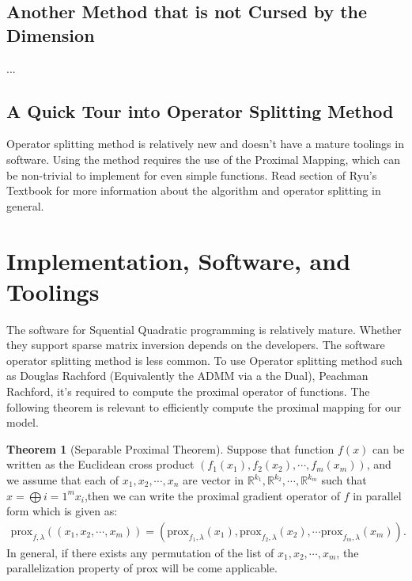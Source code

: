\documentclass[11pt]{article}
\theoremstyle{definition}
\newtheorem{theorem}{Theorem}       %
\numberwithin{equation}{subsection}
\begin{document}
    \subsection{Another Method that is not Cursed by the Dimension}
        ...
    \subsection{A Quick Tour into Operator Splitting Method}
        Operator splitting method is relatively new and doesn't have a mature toolings in software. 
        Using the method requires the use of the Proximal Mapping, which can be non-trivial to implement for even simple functions. 
        Read section \cite[section 2.7]{ryu_large-scale_2022} of Ryu's Textbook for more information about the algorithm and operator splitting in general. 
        
        
\section{Implementation, Software, and Toolings}
    The software for Squential Quadratic programming is relatively mature. 
    Whether they support sparse matrix inversion depends on the developers. 
    The software operator splitting method is less common.
    To use Operator splitting method such as Douglas Rachford (Equivalently the ADMM via a the Dual), Peachman Rachford, it's required to compute the proximal operator of functions. 
    The following theorem is relevant to efficiently compute the proximal mapping for our model. 
    \begin{theorem}[Separable Proximal Theorem]
        Suppose that function $f(x)$ can be written as the Euclidean cross product $(f_1(x_1), f_2(x_2), \cdots, f_m(x_m))$, and we assume that each of $x_1, x_2, \cdots, x_n$ are vector in $\mathbb R^{k_1}, \mathbb R^{k_2}, \cdots, \mathbb R^{k_m}$ such that $x =\bigoplus{i=1}^m x_i$,then we can write the proximal gradient operator of $f$ in parallel form which is given as: 
        $$
        \begin{aligned}
            \text{prox}_{f, \lambda}((x_1, x_2, \cdots, x_m)) = 
            (\text{prox}_{f_1, \lambda}(x_1), \text{prox}_{f_2, \lambda}(x_2), \cdots \text{prox}_{f_m, \lambda}(x_m)).
        \end{aligned}
        $$
        In general, if there exists any permutation of the list of $x_1, x_2, \cdots, x_m$, the parallelization property of prox will be come applicable.     
    \end{theorem}
\end{document}
